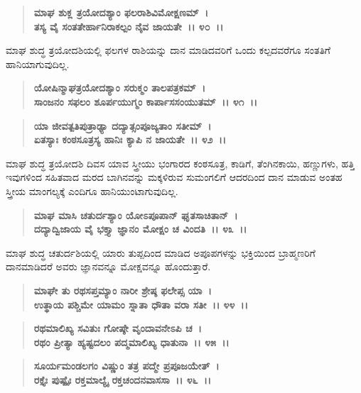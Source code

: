 \begin{verse}
\textbf{ಮಾಘ ಶುಕ್ಲ ತ್ರಯೋದಶ್ಯಾಂ ಫಲರಾಶಿವಿಮೋಕ್ಷಣಮ್~।}\\\textbf{ತಸ್ಯ ವೈ ಸಂತತೇರ್ಹಾನಿರಾಕಲ್ಪಂ ನೈವ ಜಾಯತೇ~।। ೪೦~।। }
\end{verse}

ಮಾಘ ಶುದ್ಧ ತ್ರಯೋದಶಿಯಲ್ಲಿ ಫಲಗಳ ರಾಶಿಯನ್ನು ದಾನ ಮಾಡಿದವರಿಗೆ ಒಂದು ಕಲ್ಪದವರೆಗೂ ಸಂತತಿಗೆ ಹಾನಿಯಾಗುವುದಿಲ್ಲ.

\begin{verse}
\textbf{ಯೋಷಿನ್ಮಾಘತ್ರಯೋದಶ್ಯಾಂ ಸರುಕ್ಮಂ ತಾಲಪತ್ರಕಮ್~।}\\\textbf{ಸಾಂಜನಂ ಸಫಲಂ ಶೂರ್ಪಯುಗ್ಮಂ ಕಾರ್ಪಾಸಸಂಯುತಮ್~।। ೪೧~।। }
\end{verse}

\begin{verse}
\textbf{ಯಾ ಜೀವತ್ಪತಿಪುತ್ರಾಢ್ಯಾ ದದ್ಯಾತ್ಸಂಪೂಜ್ಯತಾಂ ಸತೀಮ್~।}\\\textbf{ಏತಸ್ಯಾಃ ಕಂಠಸೂತ್ರಸ್ಯ ಹಾನಿಃ ಕ್ಯಾಪಿ ನ ಜಾಯತೇ~।। ೪೨~।।}
\end{verse}

ಮಾಘ ಶುದ್ಧ ತ್ರಯೋದಶಿ ದಿವಸ ಯಾವ ಸ್ತ್ರೀಯು ಭಂಗಾರದ ಕಂಠಸೂತ್ರ, ಕಾಡಿಗೆ, ತೆಂಗಿನಕಾಯಿ, ಹಣ್ಣುಗಳು, ಹತ್ತಿ ಇವುಗಳಿಂದ ಸಹಿತವಾದ ಮರದ ಬಾಗಿನವನ್ನು ಮಕ್ಕಳಿರುವ ಸುಮಂಗಲಿಗೆ ಆದರದಿಂದ ದಾನ ಮಾಡುವ ಅಂತಹ ಸ್ತ್ರೀಯ ಮಾಂಗಲ್ಯಕ್ಕೆ ಎಂದಿಗೂ ಹಾನಿಯುಂಟಾಗುವುದಿಲ್ಲ.

\begin{verse}
\textbf{ಮಾಘ ಮಾಸಿ ಚತುರ್ದಶ್ಯಾಂ ಯೋಽಪೂಪಾನ್ ಘೃತಸಾಚಿತಾನ್~।}\\\textbf{ದದ್ಯಾದ್ವಿಜಾಯ ವೈ ಭಕ್ತ್ಯಾ ಜ್ಞಾನಂ ಮೋಕ್ಷಂ ಚ ವಿಂದತಿ~।। ೪೩~।।}
\end{verse}

ಮಾಘ ಶುದ್ಧ ಚತುರ್ದಶಿಯಲ್ಲಿ ಯಾರು ತುಪ್ಪದಿಂದ ಮಾಡಿದ ಅಪೂಪಗಳನ್ನು ಭಕ್ತಿಯಿಂದ ಬ್ರಾಹ್ಮಣರಿಗೆ ದಾನಮಾಡಿದರೆ ಅವರು ಜ್ಞಾನವನ್ನೂ ಮೋಕ್ಷವನ್ನೂ ಹೊಂದುತ್ತಾರೆ.

\begin{verse}
\textbf{ಮಾಘೇ ತು ರಥಸಪ್ತಮ್ಯಾಂ ನಾರೀ ಶ್ರೇಷ್ಠ ಫಲೇಪ್ಸ ಯಾ~।}\\\textbf{ಉತ್ಥಾಯ ಪಶ್ಚಿಮೇ ಯಾಮಂ ಸ್ನಾತಾ ಧೌತಾ ವರಾ ಸತೀ~।। ೪೪~।। }
\end{verse}

\begin{verse}
\textbf{ರಥಮಾಲಿಖ್ಯ ಸವಿತುಃ ಗೋಷ್ಠೇ ವೃಂದಾವನೇಽಪಿ ಚ~।}\\\textbf{ರಥಂ ಪ್ರೀತ್ಯಾ ಹ್ಯಷ್ಟದಲಂ ಪದ್ಮಮಾಲಿಖ್ಯ ಧಾತುನಾ~।। ೪೫~।। }
\end{verse}

\begin{verse}
\textbf{ಸೂರ್ಯಮಂಡಲಗಂ ವಿಷ್ಣುಂ ತತ್ರ ಪದ್ಮೇ ಪ್ರಪೂಜಯೇತ್~।}\\\textbf{ರಕ್ತೈಃ ಪುಷ್ಪೈಃ ರಕ್ತಮಾಲ್ಯೈ ರಕ್ತಚಂದನವಾಸಸಾ~।। ೪೬~।।}
\end{verse}

